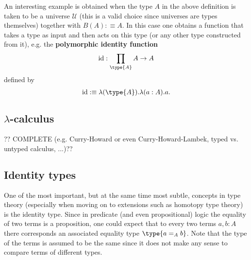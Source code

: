     \begin{example}
        An interesting example is obtained when the type $A$ in the above definition is taken to be a universe $\mathcal{U}$ (this is a valid choice since universes are types themselves) together with $B(A):\equiv A$. In this case one obtains a function that takes a type as input and then acts on this type (or any other type constructed from it), e.g. the \textbf{polymorphic identity function}
        \begin{gather}
            \text{id}:\prod_{\type{A}}A\rightarrow A
        \end{gather}
        defined by
        \begin{gather}
            \text{id}:\equiv\lambda(\type{A}).\lambda(a:A).a.
        \end{gather}
    \end{example}

\subsection{\texorpdfstring{$\lambda$-calculus}{Lambda-calculus}}

    ?? COMPLETE (e.g. Curry-Howard or even Curry-Howard-Lambek, typed vs. untyped calculus, ...)??

\subsection{Identity types}

    One of the most important, but at the same time most subtle, concepts in type theory (especially when moving on to extensions such as homotopy type theory) is the identity type. Since in predicate (and even propositional) logic the equality of two terms is a proposition, one could expect that to every two terms $a,b:A$ there corresponds an associated equality type $\type{a=_Ab}$. Note that the type of the terms is assumed to be the same since it does not make any sense to compare terms of different types.

